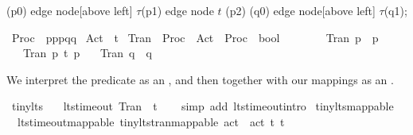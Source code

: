 \begin{isabellebody}
\begin{isamarkuptext}
{    \path   (p0) edge node[above left]  {$\tau$}(p1)
                 edge node              {$t$}   (p2)
            (q0) edge node[above left]  {$\tau$}(q1);
}%
\end{isamarkuptext}\isamarkuptrue%
\isamarkupfalse%
\ Proc\ {\isacharequal}{\kern0pt}\ p{}{\isacharbar}{\kern0pt}p{}{\isacharbar}{\kern0pt}p{}{\isacharbar}{\kern0pt}q{}{\isacharbar}{\kern0pt}q{}\isanewline
{}\isamarkupfalse%
\ Act\ {\isacharequal}{\kern0pt}\ {\isasymtau}{\isacharbar}{\kern0pt}t\isanewline
{}\isamarkupfalse%
\ Tran\ {\isacharcolon}{\kern0pt}{\isacharcolon}{\kern0pt}\ {\isacartoucheopen}Proc\ {\isasymRightarrow}\ Act\ {\isasymRightarrow}\ Proc\ {\isasymRightarrow}\ bool{\isacartoucheclose}\isanewline
\ \ \ \isanewline
\ \ \ \ {\isacartoucheopen}Tran\ p{}\ {\isasymtau}\ p{}{\isacartoucheclose}\isanewline
\ \ {\isacharbar}{\kern0pt}\ {\isacartoucheopen}Tran\ p{}\ t\ p{}{\isacartoucheclose}\isanewline
\ \ {\isacharbar}{\kern0pt}\ {\isacartoucheopen}Tran\ q{}\ {\isasymtau}\ q{}{\isacartoucheclose}%
\begin{isamarkuptext}%
We interpret the  predicate as an , and then together with our mappings as an .%
\end{isamarkuptext}\isamarkuptrue%
%
\isadelimvisible
%
\endisadelimvisible
%
\isatagvisible
{}\isamarkupfalse%
\ tiny{\isacharunderscore}{\kern0pt}lts{\isacharcolon}{\kern0pt}\ \isanewline
\ \ lts{\isacharunderscore}{\kern0pt}timeout\ Tran\ {\isasymtau}\ t\isanewline
\ \ \isamarkupfalse%
\ {\isacharparenleft}{\kern0pt}simp\ add{\isacharcolon}{\kern0pt}\ lts{\isacharunderscore}{\kern0pt}timeout{\isachardot}{\kern0pt}intro{\isacharparenright}{\kern0pt}\isanewline
{}\isamarkupfalse%
\ tiny{\isacharunderscore}{\kern0pt}lts{\isacharunderscore}{\kern0pt}mappable{\isacharcolon}{\kern0pt}\ \isanewline
\ \ lts{\isacharunderscore}{\kern0pt}timeout{\isacharunderscore}{\kern0pt}mappable\ tiny{\isacharunderscore}{\kern0pt}lts{\isachardot}{\kern0pt}tran{\isacharunderscore}{\kern0pt}mappable\ {\isacartoucheopen}act\ {\isasymtau}{\isacartoucheclose}\ {\isacartoucheopen}act\ t{\isacartoucheclose}\ {\isacartoucheopen}t{\isacharunderscore}{\kern0pt}{\isasymepsilon}{\isacartoucheclose}\ \isanewline

\end{isabellebody}
